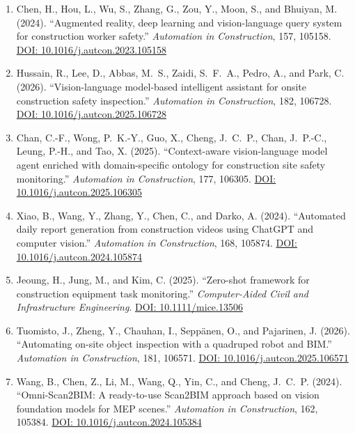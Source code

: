 \documentclass[11pt]{article}
\begin{document}
\begin{enumerate}[label=\textbf{C\arabic*.}]

\item Chen, H., Hou, L., Wu, S., Zhang, G., Zou, Y., Moon, S., and Bhuiyan, M. (2024). ``Augmented reality, deep learning and vision-language query system for construction worker safety.'' \textit{Automation in Construction}, 157, 105158. \href{https://doi.org/10.1016/j.autcon.2023.105158}{DOI: 10.1016/j.autcon.2023.105158}

\item Hussain, R., Lee, D., Abbas, M.~S., Zaidi, S.~F.~A., Pedro, A., and Park, C. (2026). ``Vision-language model-based intelligent assistant for onsite construction safety inspection.'' \textit{Automation in Construction}, 182, 106728. \href{https://doi.org/10.1016/j.autcon.2025.106728}{DOI: 10.1016/j.autcon.2025.106728}

\item Chan, C.-F., Wong, P.~K.-Y., Guo, X., Cheng, J.~C.~P., Chan, J.~P.-C., Leung, P.-H., and Tao, X. (2025). ``Context-aware vision-language model agent enriched with domain-specific ontology for construction site safety monitoring.'' \textit{Automation in Construction}, 177, 106305. \href{https://doi.org/10.1016/j.autcon.2025.106305}{DOI: 10.1016/j.autcon.2025.106305}

\item Xiao, B., Wang, Y., Zhang, Y., Chen, C., and Darko, A. (2024). ``Automated daily report generation from construction videos using ChatGPT and computer vision.'' \textit{Automation in Construction}, 168, 105874. \href{https://doi.org/10.1016/j.autcon.2024.105874}{DOI: 10.1016/j.autcon.2024.105874}

\item Jeoung, H., Jung, M., and Kim, C. (2025). ``Zero-shot framework for construction equipment task monitoring.'' \textit{Computer-Aided Civil and Infrastructure Engineering}. \href{https://doi.org/10.1111/mice.13506}{DOI: 10.1111/mice.13506}

\item Tuomisto, J., Zheng, Y., Chauhan, I., Sepp\"anen, O., and Pajarinen, J. (2026). ``Automating on-site object inspection with a quadruped robot and BIM.'' \textit{Automation in Construction}, 181, 106571. \href{https://doi.org/10.1016/j.autcon.2025.106571}{DOI: 10.1016/j.autcon.2025.106571}

\item Wang, B., Chen, Z., Li, M., Wang, Q., Yin, C., and Cheng, J.~C.~P. (2024). ``Omni-Scan2BIM: A ready-to-use Scan2BIM approach based on vision foundation models for MEP scenes.'' \textit{Automation in Construction}, 162, 105384. \href{https://doi.org/10.1016/j.autcon.2024.105384}{DOI: 10.1016/j.autcon.2024.105384}

\end{enumerate}
\end{document}
